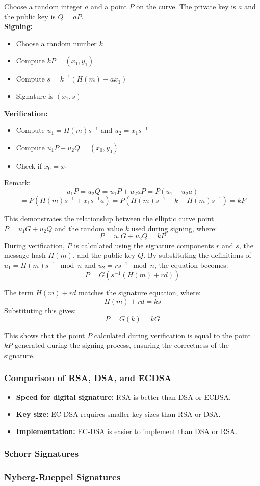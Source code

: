 Choose a random integer $a$ and a point $P$ on the curve. The private key is $a$ and the public key is $Q = aP$. \\

\textbf{Signing:}
\begin{itemize}
    \item Choose a random number $k$
    \item Compute $kP = (x_1, y_1)$
    \item Compute $s = k^{-1}(H(m) + ax_1)$
    \item Signature is $(x_1, s)$
\end{itemize}

\textbf{Verification:}
\begin{itemize}
    \item Compute $u_1 = H(m)s^{-1}$ and $u_2 = x_1s^{-1}$
    \item Compute $u_1P + u_2Q = (x_0, y_0)$
    \item Check if $x_0 = x_1$
\end{itemize}

Remark:
\[ u_1P = u_2Q = u_1P + u_2aP = P(u_1 + u_2a) \]
\[ = P(H(m)s^{-1} + x_1s^{-1}a) = P(H(m)s^{-1} + k - H(m)s^{-1}) = kP\]

This demonstrates the relationship between the elliptic curve point \(P = u_1G + u_2Q\) and the random value \(k\) used during signing, where:
    \[
    P = u_1G + u_2Q = kP
    \]
During verification, \(P\) is calculated using the signature components \(r\) and \(s\), the message hash \(H(m)\), and the public key \(Q\).
 By substituting the definitions of \(u_1 = H(m)s^{-1} \mod n\) and \(u_2 = rs^{-1} \mod n\), the equation becomes:
    \[
    P = G(s^{-1}(H(m) + rd))
    \]

    The term \(H(m) + rd\) matches the signature equation, where:
    \[
    H(m) + rd = ks
    \]
    Substituting this gives:
    \[
    P = G(k) = kG
    \]

    This shows that the point \(P\) calculated during verification is equal to the point \(kP\) generated during the signing process, ensuring the correctness of the signature.





\subsubsection{Comparison of RSA, DSA, and ECDSA}
\begin{itemize}
    \item \textbf{Speed for digital signature:} RSA is better than DSA or ECDSA.
    \item \textbf{Key size:} EC-DSA requires smaller key sizes than RSA or DSA.
    \item \textbf{Implementation:} EC-DSA is easier to implement than DSA or RSA.
\end{itemize}

\subsubsection{Schorr Signatures}
\subsubsection{Nyberg-Rueppel Signatures}